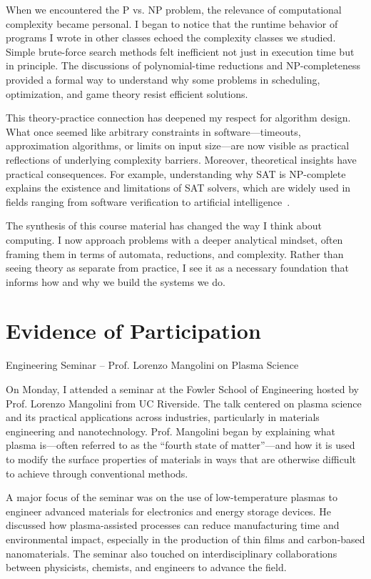 \documentclass{article}
\theoremstyle{theorem}
\theoremstyle{definition}
\theoremstyle{remark}
\begin{document}
When we encountered the P vs. NP problem, the relevance of computational complexity became personal. I began to notice that the runtime behavior of programs I wrote in other classes echoed the complexity classes we studied. Simple brute-force search methods felt inefficient not just in execution time but in principle. The discussions of polynomial-time reductions and NP-completeness provided a formal way to understand why some problems in scheduling, optimization, and game theory resist efficient solutions.

This theory-practice connection has deepened my respect for algorithm design. What once seemed like arbitrary constraints in software---timeouts, approximation algorithms, or limits on input size---are now visible as practical reflections of underlying complexity barriers. Moreover, theoretical insights have practical consequences. For example, understanding why SAT is NP-complete explains the existence and limitations of SAT solvers, which are widely used in fields ranging from software verification to artificial intelligence~\cite{cook1971}.

The synthesis of this course material has changed the way I think about computing. I now approach problems with a deeper analytical mindset, often framing them in terms of automata, reductions, and complexity. Rather than seeing theory as separate from practice, I see it as a necessary foundation that informs how and why we build the systems we do.


\section{Evidence of Participation}

Engineering Seminar -- Prof. Lorenzo Mangolini on Plasma Science

On Monday, I attended a seminar at the Fowler School of Engineering hosted by Prof. Lorenzo Mangolini from UC Riverside. The talk centered on plasma science and its practical applications across industries, particularly in materials engineering and nanotechnology. Prof. Mangolini began by explaining what plasma is---often referred to as the ``fourth state of matter''---and how it is used to modify the surface properties of materials in ways that are otherwise difficult to achieve through conventional methods.

A major focus of the seminar was on the use of low-temperature plasmas to engineer advanced materials for electronics and energy storage devices. He discussed how plasma-assisted processes can reduce manufacturing time and environmental impact, especially in the production of thin films and carbon-based nanomaterials. The seminar also touched on interdisciplinary collaborations between physicists, chemists, and engineers to advance the field.
\end{document}
